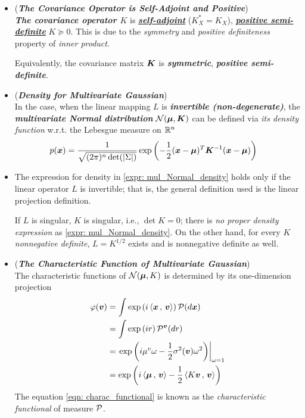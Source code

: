\documentclass[11pt]{article}
\begin{document}
\begin{itemize}
\item \begin{remark} (\emph{\textbf{The Covariance Operator is Self-Adjoint and Positive}})\\
\emph{\textbf{The covariance operator $K$}} is \underline{\emph{\textbf{self-adjoint}}} ($K_X^{*} = K_X$), \underline{\emph{\textbf{positive semi-definite}}} $K \succeq 0$. This is due to the \emph{symmetry} and \emph{positive definiteness} property of \emph{inner product}.

Equivalently, the covariance matrix $\boldsymbol{K}$ is \emph{\textbf{symmetric}}, \emph{\textbf{positive semi-definite}}.
\end{remark}

\item \begin{remark} (\emph{\textbf{Density for Multivariate Gaussian}})\\
In the case, when the linear mapping $L$ is \emph{\textbf{invertible (non-degenerate)}}, the \emph{\textbf{multivariate Normal distribution}} ${\mathcal N}(\boldsymbol{\mu}, \boldsymbol{K})$ can be defined via \emph{its density function}  w.r.t.  the Lebesgue measure on ${\mathbb R}^{n}$
\begin{align}
p(\boldsymbol{x}) &= \frac{1}{\sqrt{(2\pi)^{n}\det(|\Sigma|)}}\exp\left( -\frac{1}{2}(\boldsymbol{x}- \boldsymbol{\mu})^{T}\boldsymbol{K}^{-1}(\boldsymbol{x}- \boldsymbol{\mu}) \right) \label{expr: mul_Normal_density}
\end{align}
\end{remark}

\item \begin{remark}
The expression for density in \eqref{expr: mul_Normal_density} holds only if the linear operator $L$ is invertible; that is, the general definition used is the linear projection definition. \citep{lifshits2013gaussian}

If $L$ is singular, $K$ is singular, i.e., $\det K = 0$; there is \emph{no proper density expression} as \eqref{expr: mul_Normal_density}. On the other hand, for every $K$ \emph{nonnegative definite}, $L = K^{1/2}$ exists and is nonnegative definite as well. 
\end{remark}

\item \begin{remark} (\emph{\textbf{The Characteristic Function of Multivariate Gaussian}})\\
The characteristic functions of ${\mathcal N}(\boldsymbol{\mu}, K)$ is determined by its one-dimension projection
\begin{align}
\varphi(\boldsymbol{v}) &= \int \exp\left(i \left\langle \boldsymbol{x}\,,\, \boldsymbol{v} \right\rangle\right){\mathcal P}(d\boldsymbol{x})  \label{eqn: charac_functional} \\
&= \int \exp\left(i r\right){\mathcal P}^{\boldsymbol{v}}(dr) \nonumber\\
&= \left.{\exp\left(i\mu^{v}\omega - \frac{1}{2}\sigma^{2}(\boldsymbol{v})\omega^{2} \right)}\right\vert_{\omega = 1} \nonumber\\
&= \exp\left(i \left\langle \boldsymbol{\mu}\,,\, \boldsymbol{v} \right\rangle - \frac{1}{2}\left\langle K\boldsymbol{v}\,,\, \boldsymbol{v} \right\rangle \right) \nonumber
\end{align}
The equation \eqref{eqn: charac_functional} is known as the \emph{characteristic functional} of measure ${\mathcal P}$. 


\end{remark}
\end{itemize}
\end{document}
